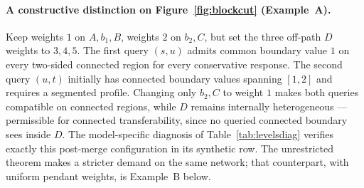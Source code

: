 \paragraph{A constructive distinction on Figure~\ref{fig:blockcut}
(Example~A).}
Keep weights $1$ on $A,b_1,B$, weights $2$ on $b_2,C$, but set the three
off-path $D$ weights to $3,4,5$. The first query $(s,u)$ admits common
boundary value $1$ on every two-sided connected region for every conservative
response. The second query $(u,t)$ initially has connected boundary values
spanning $[1,2]$ and requires a segmented profile. Changing only
$b_2,C$ to weight $1$ makes both queries compatible on connected
regions, while $D$ remains internally heterogeneous --- permissible
for connected transferability, since no queried connected boundary
sees inside $D$. The model-specific diagnosis of
Table~\ref{tab:levelsdiag} verifies exactly this post-merge
configuration in its synthetic row. The unrestricted theorem makes a
stricter demand on the same network; that counterpart, with uniform
pendant weights, is Example~B below.

